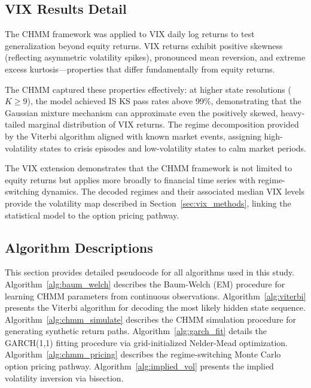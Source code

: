 \subsection{VIX Results Detail}

The CHMM framework was applied to VIX daily log returns to test generalization beyond equity returns.
VIX returns exhibit positive skewness (reflecting asymmetric volatility spikes), pronounced mean reversion, and extreme excess kurtosis---properties that differ fundamentally from equity returns.

The CHMM captured these properties effectively: at higher state resolutions ($K \geq 9$), the model achieved IS KS pass rates above 99\%, demonstrating that the Gaussian mixture mechanism can approximate even the positively skewed, heavy-tailed marginal distribution of VIX returns.
The regime decomposition provided by the Viterbi algorithm aligned with known market events, assigning high-volatility states to crisis episodes and low-volatility states to calm market periods.

The VIX extension demonstrates that the CHMM framework is not limited to equity returns but applies more broadly to financial time series with regime-switching dynamics.
The decoded regimes and their associated median VIX levels provide the volatility map described in Section~\ref{sec:vix_methods}, linking the statistical model to the option pricing pathway.

\subsection{Algorithm Descriptions}
\label{sec:algorithms}

This section provides detailed pseudocode for all algorithms used in this study.
Algorithm~\ref{alg:baum_welch} describes the Baum-Welch (EM) procedure for learning CHMM parameters from continuous observations.
Algorithm~\ref{alg:viterbi} presents the Viterbi algorithm for decoding the most likely hidden state sequence.
Algorithm~\ref{alg:chmm_simulate} describes the CHMM simulation procedure for generating synthetic return paths.
Algorithm~\ref{alg:garch_fit} details the GARCH(1,1) fitting procedure via grid-initialized Nelder-Mead optimization.
Algorithm~\ref{alg:chmm_pricing} describes the regime-switching Monte Carlo option pricing pathway.
Algorithm~\ref{alg:implied_vol} presents the implied volatility inversion via bisection.

